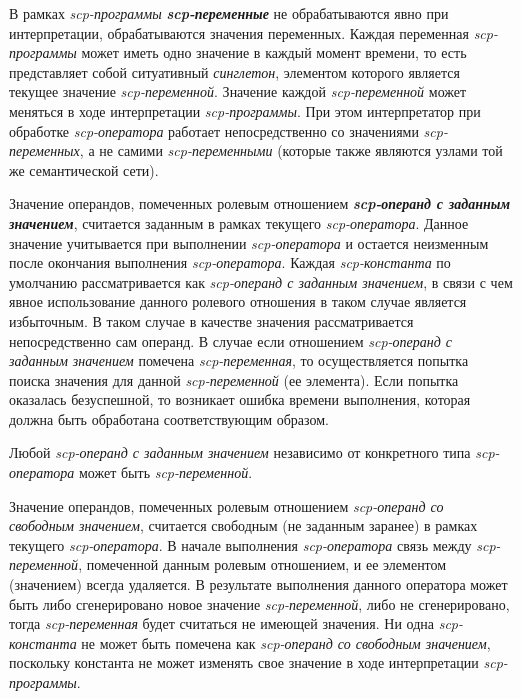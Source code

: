 В рамках \textit{scp-программы} \textbf{\textit{scp-переменные\scnrolesign}} не обрабатываются явно при интерпретации, обрабатываются значения переменных. Каждая переменная \textit{scp-программы} может иметь одно значение в каждый момент времени, то есть представляет собой ситуативный \textit{синглетон}, элементом которого является текущее значение \textit{scp-переменной\scnrolesign}. Значение каждой \textit{scp-переменной\scnrolesign} может меняться в ходе интерпретации \textit{scp-программы}. При этом интерпретатор при обработке \textit{scp-оператора} работает непосредственно со значениями \textit{\mbox{scp-переменных\scnrolesign}}, а не самими \textit{scp-переменными\scnrolesign} (которые также являются узлами той же семантической сети).

Значение операндов, помеченных ролевым отношением \textbf{\textit{scp-операнд с заданным значением\scnrolesign}}, считается заданным в рамках текущего \textit{scp-оператора}. Данное значение учитывается при выполнении \textit{scp-оператора} и остается неизменным после окончания выполнения \textit{scp-оператора}. Каждая \textit{scp-константа\scnrolesign} по умолчанию рассматривается как \textit{scp-операнд с заданным значением\scnrolesign}, в связи с чем явное использование данного ролевого отношения в таком случае является избыточным. В таком случае в качестве значения рассматривается непосредственно сам операнд. В случае если отношением \textit{\mbox{scp-операнд} с заданным значением\scnrolesign} помечена \textit{scp-переменная\scnrolesign}, то осуществляется попытка поиска значения для данной \textit{scp-переменной\scnrolesign} (ее элемента). Если попытка оказалась безуспешной, то возникает ошибка времени выполнения, которая должна быть обработана соответствующим образом.
	
Любой \textit{scp-операнд с заданным значением\scnrolesign} независимо от конкретного типа \textit{scp-оператора} может быть \textit{scp-переменной\scnrolesign}.

Значение операндов, помеченных ролевым отношением \textit{scp-операнд со свободным значением\scnrolesign}, считается свободным (не заданным заранее) в рамках текущего \textit{scp-оператора}. В начале выполнения \textit{scp-оператора} связь между \textit{scp-переменной\scnrolesign}, помеченной данным ролевым отношением, и ее элементом (значением) всегда удаляется. В результате выполнения данного оператора может быть либо сгенерировано новое значение \textit{scp-переменной\scnrolesign}, либо не сгенерировано, тогда \textit{scp-переменная\scnrolesign} будет считаться не имеющей значения. Ни одна \textit{scp-константа\scnrolesign} не может быть помечена как \textit{scp-операнд со свободным значением\scnrolesign}, поскольку константа не может изменять свое значение в ходе интерпретации \textit{scp-программы}.

